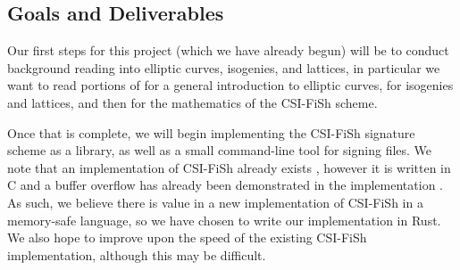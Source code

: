 \documentclass{article}
\begin{document}
\begin{flushleft}
\section*{Goals and Deliverables}

Our first steps for this project (which we have already begun) will be to conduct background reading into elliptic curves, isogenies, and lattices, in particular we want to read portions of \cite{EllipticCurveLectures} for a general introduction to elliptic curves, \cite{IsogenyIntro} for isogenies and lattices, and then \cite{csifish} for the mathematics of the CSI-FiSh scheme.

Once that is complete, we will begin implementing the CSI-FiSh signature scheme as a library, as well as a small command-line tool for signing files. We note that an implementation of CSI-FiSh already exists \cite{CSIFiShImplementation}, however it is written in C and a buffer overflow has already been demonstrated in the implementation \cite{CSIFiShBufferOverflow}. As such, we believe there is value in a new implementation of CSI-FiSh in a memory-safe language, so we have chosen to write our implementation in Rust. We also hope to improve upon the speed of the existing CSI-FiSh implementation, although this may be difficult.

\printbibliography

\end{flushleft}
\end{document}
